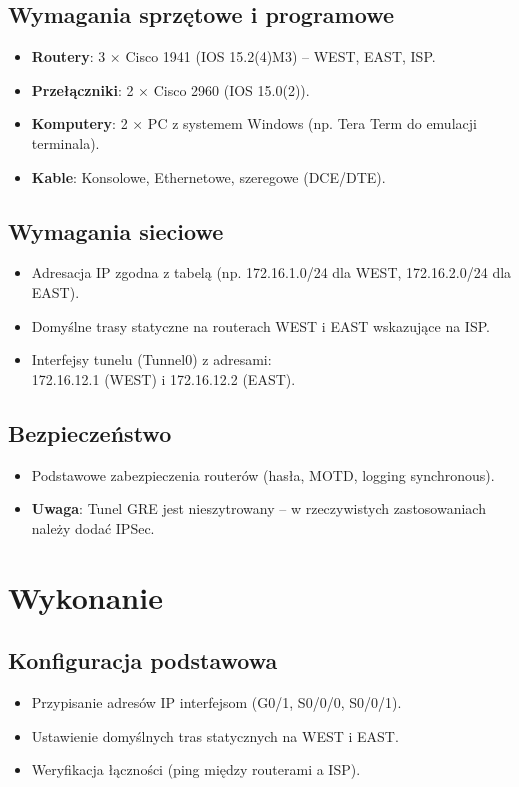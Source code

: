 \documentclass[12pt,twoside,a4paper,openany]{article}
\begin{document}
\clearpage
\subsection{Wymagania sprzętowe i programowe}
\begin{itemize}
    \item \textbf{Routery}: 3 × Cisco 1941 (IOS 15.2(4)M3) – WEST, EAST, ISP.
    \item \textbf{Przełączniki}: 2 × Cisco 2960 (IOS 15.0(2)).
    \item \textbf{Komputery}: 2 × PC z systemem Windows (np. Tera Term do emulacji terminala).
    \item \textbf{Kable}: Konsolowe, Ethernetowe, szeregowe (DCE/DTE).
\end{itemize}

\subsection{Wymagania sieciowe}
\begin{itemize}
    \item Adresacja IP zgodna z tabelą (np. 172.16.1.0/24 dla WEST, 172.16.2.0/24 dla EAST).    \item Domyślne trasy statyczne na routerach WEST i EAST wskazujące na ISP.
    \item Interfejsy tunelu (Tunnel0) z adresami:\\ 172.16.12.1 (WEST) i 172.16.12.2 (EAST).
\end{itemize}

\subsection{Bezpieczeństwo}
\begin{itemize}
    \item Podstawowe zabezpieczenia routerów (hasła, MOTD, logging synchronous).
    \item \textbf{Uwaga}: Tunel GRE jest nieszytrowany – w rzeczywistych zastosowaniach należy dodać IPSec.
\end{itemize}

\section{Wykonanie}

\subsection{Konfiguracja podstawowa}
\begin{itemize}
    \item Przypisanie adresów IP interfejsom (G0/1, S0/0/0, S0/0/1).
    \item Ustawienie domyślnych tras statycznych na WEST i EAST.
    \item Weryfikacja łączności (ping między routerami a ISP).
\end{itemize}
\end{document}
